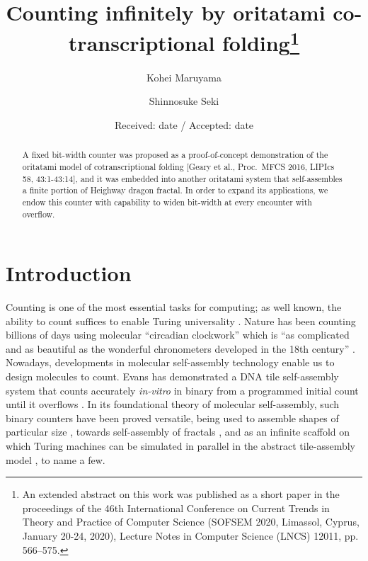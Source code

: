\documentclass[twocolumn]{svjour3}
\begin{document}
\title{Counting infinitely by oritatami co-transcriptional folding\thanks{An extended abstract on this work was published as a short paper in the proceedings of the 46th International Conference on Current Trends in Theory and Practice of Computer Science (SOFSEM 2020, Limassol, Cyprus, January 20-24, 2020), Lecture Notes in Computer Science (LNCS) 12011, pp. 566--575.}}

\author{
Kohei Maruyama\and
Shinnosuke Seki
}

\date{Received: date / Accepted: date}

\maketitle


\begin{abstract}
A fixed bit-width counter was proposed as a proof-of-concept demonstration of the oritatami model of cotranscriptional folding [Geary et al., Proc.~MFCS 2016, LIPIcs 58, 43:1-43:14], and it was embedded into another oritatami system that self-assembles a finite portion of Heighway dragon fractal. 
In order to expand its applications, we endow this counter with capability to widen bit-width at every encounter with overflow. 
\end{abstract}

	\section{Introduction}

Counting is one of the most essential tasks for computing; as well known, the ability to count suffices to enable Turing universality \cite{Minsky1967}. 
Nature has been counting billions of days using molecular ``circadian clockwork'' which is ``as complicated and as beautiful as the wonderful chronometers developed in the 18th century''  \cite{McClung2006}. 
Nowadays, developments in molecular self-assembly technology enable us to design molecules to count. 
Evans has demonstrated a DNA tile self-assembly system that counts accurately \textit{in-vitro} in binary from a programmed initial count until it overflows \cite{EvansPhD}. 
In its foundational theory of molecular self-assembly, such binary counters have been proved versatile, being used to assemble shapes of particular size \cite{AdChGoHu2001,RothemundWinfree2000}, towards self-assembly of fractals \cite{MasudaSekiUbukata2018}, and as an infinite scaffold on which Turing machines can be simulated in parallel in the abstract tile-assembly model \cite{BrChDoKaSe2013,LathropLPS2011}, to name a few. 
\end{document}
